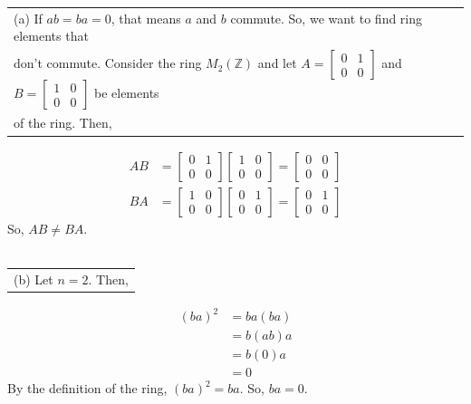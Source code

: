 \documentclass[12pt, letterpaper]{article}
\begin{document}
\indent \indent \begin{tabular}[t]{l}
    (a) If $ab = ba = 0$, that means $a$ and $b$ commute. So, we want to find ring elements that \\
    don't commute. Consider the ring $M_2(\mathbb{Z})$ and let $A = \begin{bmatrix} 0 & 1 \\ 0 & 0 \end{bmatrix}$ and $B = \begin{bmatrix} 1 & 0 \\ 0 & 0 \end{bmatrix}$ be elements \\
    of the ring. Then,
    \end{tabular}
    \begin{align*}
        AB &= \begin{bmatrix} 0 & 1 \\ 0 & 0 \end{bmatrix} \begin{bmatrix} 1 & 0 \\ 0 & 0 \end{bmatrix} = \begin{bmatrix} 0 & 0 \\ 0 & 0 \end{bmatrix} \\
        BA &= \begin{bmatrix} 1 & 0 \\ 0 & 0 \end{bmatrix} \begin{bmatrix} 0 & 1 \\ 0 & 0 \end{bmatrix} = \begin{bmatrix} 0 & 1 \\ 0 & 0 \end{bmatrix}
    \end{align*}
    \indent \indent \indent So, $AB \neq BA$. \\\\
\indent \indent \begin{tabular}[t]{l}
    (b) Let $n = 2$. Then, 
    \end{tabular}
    \begin{align*}
        (ba)^{2} &= ba(ba) \\
        &= b(ab)a \\
        &= b(0)a \\
        &= 0
        \end{align*}
    \indent \indent \indent By the definition of the ring, $(ba)^{2} = ba$. So, $ba = 0$.
\bigskip
\end{document}
